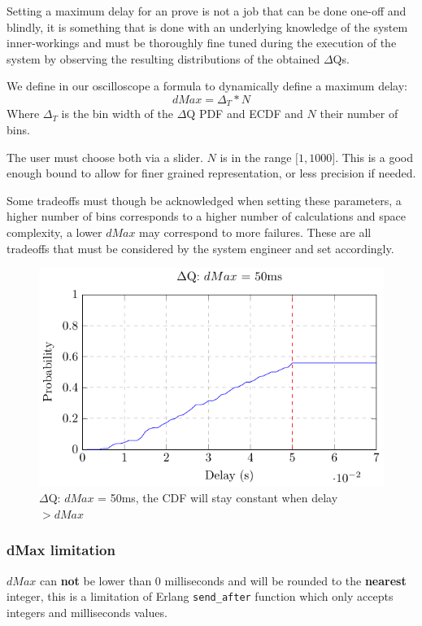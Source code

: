 Setting a maximum delay for an prove is not a job that can be done one-off and blindly, it is something that is done with an underlying knowledge of the system inner-workings and must be thoroughly fine tuned during the execution of the system by observing the resulting distributions of the obtained $\Delta$Qs. 

We define in our oscilloscope a formula to dynamically define a maximum delay:
\begin{equation}
    dMax = \Delta_{T} * N  
    \label{eq:dMaxU}
\end{equation}
Where $\Delta_{T}$ is the bin width of the $\Delta$Q PDF and ECDF and $N$ their number of bins.

The user must choose both via a slider. $N$ is in the range $\lbrack 1, 1000 \rbrack$. This is a good enough bound to allow for finer grained representation, or less precision if needed. 

Some tradeoffs must though be acknowledged when setting these parameters, a higher number of bins corresponds to a higher number of calculations and space complexity, a lower $dMax$ may correspond to more failures. These are all tradeoffs that must be considered by the system engineer and set accordingly.
    \begin{figure}[H]
        \begin{center}
            \includegraphics[scale = 1]{tikz/cdf_dmax.pdf}
        \end{center}
        \caption{$\Delta$Q: $dMax$ = 50ms, the CDF will stay constant when delay $> dMax$}
    \end{figure}

    \subsubsection{dMax limitation}
        $dMax$ can \textbf{not} be lower than 0 milliseconds and will be rounded to the \textbf{nearest} integer, this is a limitation of Erlang \texttt{send\_after} function which only accepts integers and milliseconds values.


